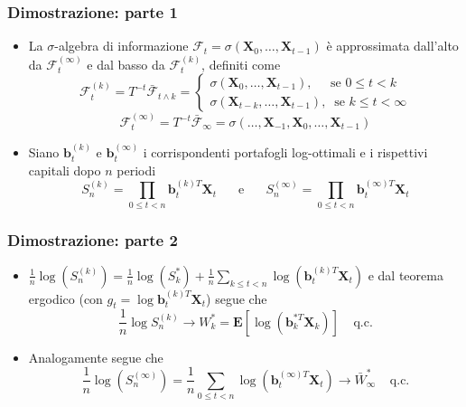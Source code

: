 \documentclass{beamer}
\theoremstyle{plain}
\theoremstyle{definition}
\theoremstyle{remark}
\newcommand{\X}{\bm{X}}
\newcommand{\B}{\bm{b}}
\newcommand{\F}{\mathcal{F}}
\newcommand{\E}{\mathbf{E}}
\begin{document}
\begin{frame}
	\frametitle{Dimostrazione: parte 1}
	\begin{itemize}
	\item La $\sigma$-algebra di informazione $\F_t=\sigma(\X_0,\ldots, \X_{t-1})$ è approssimata dall'alto da $\F_t^{(\infty)}$ e dal basso da $\F_t^{(k)}$, definiti come
	\begin{equation*}
	\F_t^{(k)} = T^{-t}\bar{\F}_{t\wedge k} = \begin{cases}
	\sigma(\X_0, \ldots, \X_{t-1}), \;\;\;\;\; \text{se } 0\leq t <k\\
	\sigma(\X_{t-k},\ldots, \X_{t-1}), \;\; \text{se } k\leq t<\infty
	\end{cases}
	\end{equation*}
	\begin{equation*}
	\F_t^{(\infty)}=T^{-t}\bar{\F}_{\infty}=\sigma(\ldots, \X_{-1},\X_0,\ldots, \X_{t-1})
	\end{equation*}
	\item Siano $\B_t^{(k)}$ e $\B_t^{(\infty)}$ i corrispondenti portafogli log-ottimali e i rispettivi capitali dopo $n$ periodi
	\begin{equation*}
	S_n^{(k)} = \prod_{0\leq t <n}{\B_t^{(k)T}\X_t} \;\;\;\;\; \text{ e } \;\;\;\;\; S_n^{(\infty)}=\prod_{0\leq t <n}{\B_t^{(\infty)T}\X_t}
	\end{equation*}
\end{itemize}
\end{frame}
\begin{frame}
	\frametitle{Dimostrazione: parte 2}
	\begin{itemize}
	\item $\frac{1}{n}\log\left(S_n^{(k)}\right)=\frac{1}{n}\log (S_k^*)+\frac{1}{n}\sum_{k\leq t <n}{\log(\B_t^{(k)T}\X_t)}$ e dal teorema ergodico (con $g_t=\log \B^{(k)T}_t \X_t$) segue che
	\begin{equation*}
	\frac{1}{n}\log S_n^{(k)} \rightarrow W^*_k=\E[\log(\B_k^{*T}\X_k)] \;\;\;\; \text{q.c.}
	\end{equation*}
	\item Analogamente segue che
	\begin{equation*}
	\frac{1}{n}\log\left(S_n^{(\infty)}\right)=\frac{1}{n}\sum_{0\leq t <n}{\log(\B_t^{(\infty)T}\X_t)}\rightarrow \bar{W}^*_\infty\;\;\;\;\text{q.c.}
	\end{equation*}
	\end{itemize}
\end{frame}
\end{document}
